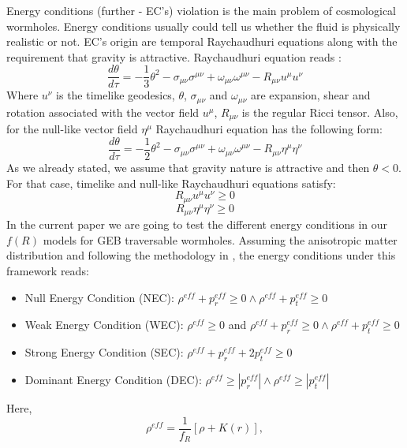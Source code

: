 Energy conditions (further - EC's) violation is the main problem of cosmological wormholes. Energy conditions usually could tell us whether the fluid is physically realistic or not. EC's origin are temporal Raychaudhuri equations along with the requirement that gravity is attractive. Raychaudhuri equation reads \cite{ref11,ref62,ref63,ref64}:
\begin{equation}
    \frac{d\theta}{d\tau}=-\frac{1}{3}\theta^2-\sigma_{\mu\nu}\sigma^{\mu\nu}+\omega_{\mu\nu}\omega^{\mu\nu}-R_{\mu\nu}u^\mu u^\nu
\end{equation}
Where $u^\nu$ is the timelike geodesics, $\theta$, $\sigma_{\mu\nu}$ and $\omega_{\mu\nu}$ are expansion, shear and rotation associated with the vector field $u^\mu$, $R_{\mu\nu}$ is the regular Ricci tensor. Also, for the null-like vector field $\eta^\mu$ Raychaudhuri equation has the following form:
\begin{equation}
        \frac{d\theta}{d\tau}=-\frac{1}{2}\theta^2-\sigma_{\mu\nu}\sigma^{\mu\nu}+\omega_{\mu\nu}\omega^{\mu\nu}-R_{\mu\nu}\eta^\mu \eta^\nu
\end{equation}
As we already stated, we assume that gravity nature is attractive and then $\theta<0$. For that case, timelike and null-like Raychaudhuri equations satisfy:
\begin{equation}
    R_{\mu\nu}u^\mu u^\nu\geq0
    \label{eq:18}
\end{equation}
\begin{equation}
    R_{\mu\nu}\eta^\mu \eta^\nu\geq0
    \label{eq:19}
\end{equation}
In the current paper we are going to test the different energy conditions in our $f(R)$ models for GEB traversable wormholes. Assuming the anisotropic matter distribution and following the methodology in \cite{ref48}, the energy conditions under this framework reads:
\begin{itemize}
    \item Null Energy Condition (NEC): $\rho^{eff}+p_r^{eff} \geq 0\land \rho^{eff}+p_t^{eff} \geq 0$
    \item Weak Energy Condition (WEC): $\rho^{eff}\geq0$ and $\rho^{eff}+p_r^{eff} \geq 0 \land \rho^{eff}+p_t^{eff} \geq 0$
    \item Strong Energy Condition (SEC): $\rho^{eff} + p_r^{eff} + 2p_t^{eff} \geq 0$
    \item Dominant Energy Condition (DEC): $\rho^{eff} \geq |p_r^{eff}| \land \rho^{eff} \geq |p_t^{eff}|$
\end{itemize}
Here,
\begin{equation}
\label{12a}
\rho^{eff}=\frac{1}{f_R}\left[\rho+K(r)\right],
\end{equation}

